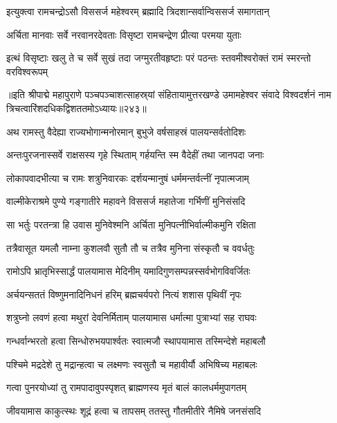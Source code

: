 \twolineshloka
{इत्युक्त्वा रामचन्द्रोऽसौ विससर्ज महेश्वरम्}
{ब्रह्मादि त्रिदशान्सर्वान्विससर्ज समागतान्}%

\twolineshloka
{अर्चिता मानवाः सर्वे नरवानरदेवताः}
{विसृष्टा रामचन्द्रेण प्रीत्या परमया युताः}%

\twolineshloka
{इत्थं विसृष्टाः खलु ते च सर्वे सुखं तदा जग्मुरतीवहृष्टाः}
{परं पठन्तः स्तवमीश्वरोक्तं रामं स्मरन्तो वरविश्वरूपम्}%

{॥इति श्रीपाद्मे महापुराणे पञ्चपञ्चाशत्साहस्र्यां संहितायामुत्तरखण्डे उमामहेश्वर संवादे विश्वदर्शनं नाम त्रिचत्वारिंशदधिकद्विशततमोऽध्यायः॥२४३॥}



\twolineshloka
{अथ रामस्तु वैदेह्या राज्यभोगान्मनोरमान्}
{बुभुजे वर्षसाहस्रं पालयन्सर्वतोदिशः}%

\twolineshloka
{अन्तःपुरजनास्सर्वे राक्षसस्य गृहे स्थिताम्}
{गर्हयन्ति स्म वैदेहीं तथा जानपदा जनाः}%

\twolineshloka
{लोकापवादभीत्या च रामः शत्रुनिवारकः}
{दर्शयन्मानुषं धर्ममन्तर्वत्नीं नृपात्मजाम्}%

\twolineshloka
{वाल्मीकेराश्रमे पुण्ये गङ्गातीरे महावने}
{विससर्ज महातेजा गर्भिणीं मुनिसंसदि}%

\twolineshloka
{सा भर्तुः परतन्त्रा हि उवास मुनिवेश्मनि}
{अर्चिता मुनिपत्नीभिर्वाल्मीकमुनि रक्षिता}%

\twolineshloka
{तत्रैवासूत यमलौ नाम्ना कुशलवौ सुतौ}
{तौ च तत्रैव मुनिना संस्कृतौ च ववर्धतुः}%

\twolineshloka
{रामोऽपि भ्रातृभिस्सार्द्धं पालयामास मेदिनीम्}
{यमादिगुणसम्पन्नस्सर्वभोगविवर्जितः}%

\twolineshloka
{अर्चयन्सततं विष्णुमनादिनिधनं हरिम्}
{ब्रह्मचर्यपरो नित्यं शशास पृथिवीं नृपः}%

\twolineshloka
{शत्रुघ्नो लवणं हत्वा मथुरां देवनिर्मिताम्}
{पालयामास धर्मात्मा पुत्राभ्यां सह राघवः}%

\twolineshloka
{गन्धर्वान्भरतो हत्वा सिन्धोरुभयपार्श्वतः}
{स्वात्मजौ स्थापयामास तस्मिन्देशे महाबलौ}%

\twolineshloka
{पश्चिमे मद्रदेशे तु मद्रान्हत्वा च लक्ष्मणः}
{स्वसुतौ च महावीर्यौ अभिषिच्य महाबलः}%

\twolineshloka
{गत्वा पुनरयोध्यां तु रामपादावुपस्पृशत्}
{ब्राह्मणस्य मृतं बालं कालधर्ममुपागतम्}%

\twolineshloka
{जीवयामास काकुत्स्थः शूद्रं हत्वा च तापसम्}
{ततस्तु गौतमीतीरे नैमिषे जनसंसदि}%

